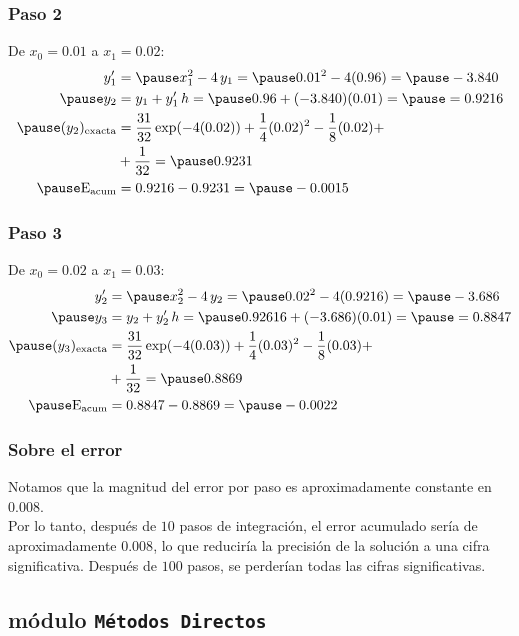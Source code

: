 \documentclass[12pt]{beamer}
\begin{document}
\begin{frame}
\frametitle{Paso 2}
De $x_{0} = 0.01$ a $x_{1} = 0.02$:
\pause
\begin{eqnarray*}
\begin{aligned}
\pderivada{y}_{1} &= \pause x_{1}^{2} - 4 \, y_{1} = \pause 0.01^{2} - 4 (0.96) = \pause - 3.840 \\ \pause
y_{2} &= y_{1} + \pderivada{y}_{1} \, h = \pause 0.96 + (- 3.840)(0.01) = \pause = 0.9216 \\ \pause
(y_{2})_{\text{exacta}} &= \dfrac{31}{32} \exp(-4 (0.02)) + \dfrac{1}{4} (0.02)^{2} - \dfrac{1}{8} (0.02) +  \\
&+ \dfrac{1}{32} = \pause 0.9231 \\ \pause
\text{E}_{\text{acum}} &= 0.9216 - 0.9231 = \pause -0.0015
\end{aligned}
\end{eqnarray*}
\end{frame}
\begin{frame}
\frametitle{Paso 3}
De $x_{0} = 0.02$ a $x_{1} = 0.03$:
\pause
\begin{eqnarray*}
\begin{aligned}
\pderivada{y}_{2} &= \pause x_{2}^{2} - 4 \, y_{2} = \pause 0.02^{2} - 4 (0.9216) = \pause - 3.686 \\ \pause
y_{3} &= y_{2} + \pderivada{y}_{2} \, h = \pause 0.92616 + (- 3.686)(0.01) = \pause = 0.8847 \\ \pause
(y_{3})_{\text{exacta}} &= \dfrac{31}{32} \exp(-4 (0.03)) + \dfrac{1}{4} (0.03)^{2} - \dfrac{1}{8} (0.03) +  \\
&+ \dfrac{1}{32} = \pause 0.8869 \\ \pause
\text{E}_{\text{acum}} &= 0.8847 - 0.8869 = \pause -0.0022
\end{aligned}
\end{eqnarray*}
\end{frame}
\begin{frame}
\frametitle{Sobre el error}
Notamos que la magnitud del error por paso es aproximadamente constante en $0.008$.
\\
\bigskip
\pause
Por lo tanto, después de $10$ pasos de integración, el error acumulado sería de aproximadamente $0.008$, lo que reduciría la precisión de la solución a una cifra significativa. \pause Después de $100$ pasos, se perderían todas las cifras significativas.
\end{frame}


\subsection{módulo \texttt{Métodos Directos}}
\end{document}
